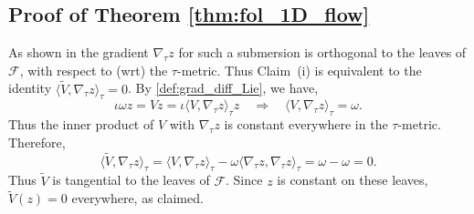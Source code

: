 \documentclass[12pt,oneside]{article}
\newcommand{\Fol}{\mathcal{F}}
\newcommand{\metric}{\tau}
\begin{document}
\subsection{Proof of Theorem \ref{thm:fol_1D_flow}} \label{sec:proof:fol_1D_flow}

As shown in \citep[][Thm 2]{Das2023Lie} the gradient $\nabla_\metric z$ for such a submersion is orthogonal to the leaves of $\Fol$, with respect to (wrt) the $\metric$-metric. Thus Claim~(i) is equivalent to the identity $\langle \tilde{V}, \nabla_\metric z \rangle_\metric = 0$. By \eqref{def:grad_diff_Lie}, we have,
%
\[ \iota \omega z = V z = \iota \langle V , \nabla_\metric z \rangle_\metric z \quad \Rightarrow \quad \langle V , \nabla_\metric z \rangle_\metric = \omega. \]
%
Thus the inner product of $V$ with $\nabla_\metric z$ is constant everywhere in the $\metric$-metric. Therefore,
%
\[ \langle \tilde{V}, \nabla_\metric z \rangle_\metric = \langle V, \nabla_\metric z \rangle_\metric - \omega \langle \nabla_\metric z, \nabla_\metric z \rangle_\metric = \omega-\omega = 0 . \]
%
Thus $\tilde{V}$ is tangential to the leaves of $\Fol$. Since $z$ is constant on these leaves, $\tilde{V}(z) = 0$ everywhere, as claimed. 
\end{document}

